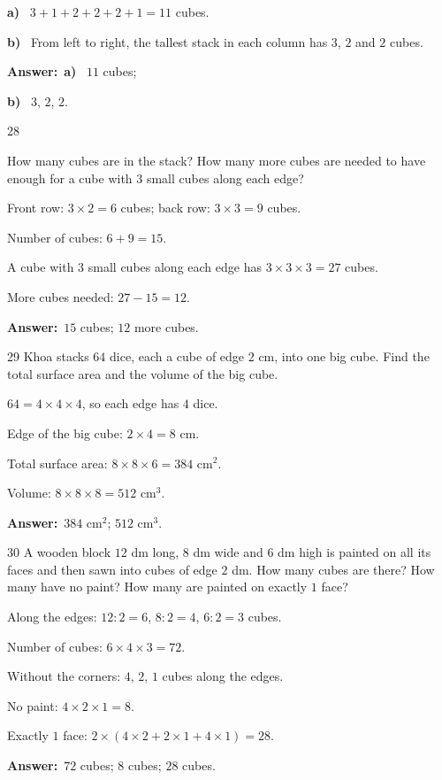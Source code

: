 \documentclass[11pt]{article}
\newif\ifsol \solfalse
\providecommand{\AnsWord}{Đáp số}
\newcommand{\dapso}[1]{\par\textbf{\AnsWord:}\ #1}
\newcommand{\probsol}[1]{%
  \begin{lrbox}{\solmeasure}\begin{minipage}{\dimexpr\linewidth-24pt\relax}#1\end{minipage}\end{lrbox}%
  \ifsol
    \begin{solbox}#1\end{solbox}%
  \else
    \setlength{\solht}{\dimexpr\ht\solmeasure+\dp\solmeasure+0.85cm\relax}%
    \ifdim\solht<1.35cm\setlength{\solht}{1.35cm}\fi
    \begin{tcolorbox}[colback=white,colframe=Line,boxrule=0.8pt,arc=5pt,
      left=8pt,right=8pt,top=4pt,bottom=4pt,height=\solht]{\footnotesize\color{Slate}\itshape\WorkWord}\end{tcolorbox}%
  \fi}
\newcommand{\pa}[1]{\textbf{#1)}\ }
\newcommand{\gap}{\vspace{0.3cm}}
\def\WorkWord{Your work:}
\def\AnsWord{Answer}
\begin{document}
\probsol{
\pa{a} $3+1+2+2+2+1=11$ cubes.\par
\pa{b} From left to right, the tallest stack in each column has $3$, $2$ and $2$ cubes.
\dapso{\pa{a} $11$ cubes;\par \pa{b} $3$, $2$, $2$.}}
\gap
\begin{probbox}{28}{\relax}
\begin{minipage}[t]{0.6\linewidth}
How many cubes are in the stack? How many more cubes are needed to have enough for a cube with $3$ small cubes along each edge?
\end{minipage}\hfill
\begin{minipage}[t]{0.36\linewidth}\vspace{0pt}\centering
{}
\end{minipage}
\end{probbox}
\probsol{
Front row: $3\times2=6$ cubes; back row: $3\times3=9$ cubes.\par
Number of cubes: $6+9=15$.\par
A cube with $3$ small cubes along each edge has $3\times3\times3=27$ cubes.\par
More cubes needed: $27-15=12$.
\dapso{$15$ cubes; $12$ more cubes.}}
\gap
\begin{probbox}{29}{\relax}
Khoa stacks $64$ dice, each a cube of edge $2$ cm, into one big cube. Find the total surface area and the volume of the big cube.
\end{probbox}
\probsol{
$64=4\times4\times4$, so each edge has $4$ dice.\par
Edge of the big cube: $2\times4=8$ cm.\par
Total surface area: $8\times8\times6=384$ cm$^2$.\par
Volume: $8\times8\times8=512$ cm$^3$.
\dapso{$384$ cm$^2$; $512$ cm$^3$.}}
\gap
\begin{probbox}{30}{\relax}
A wooden block $12$ dm long, $8$ dm wide and $6$ dm high is painted on all its faces and then sawn into cubes of edge $2$ dm. How many cubes are there? How many have no paint? How many are painted on exactly $1$ face?
\end{probbox}
\probsol{
Along the edges: $12:2=6$, $8:2=4$, $6:2=3$ cubes.\par
Number of cubes: $6\times4\times3=72$.\par
Without the corners: $4$, $2$, $1$ cubes along the edges.\par
No paint: $4\times2\times1=8$.\par
Exactly $1$ face: $2\times(4\times2+2\times1+4\times1)=28$.
\dapso{$72$ cubes; $8$ cubes; $28$ cubes.}}
\end{document}
